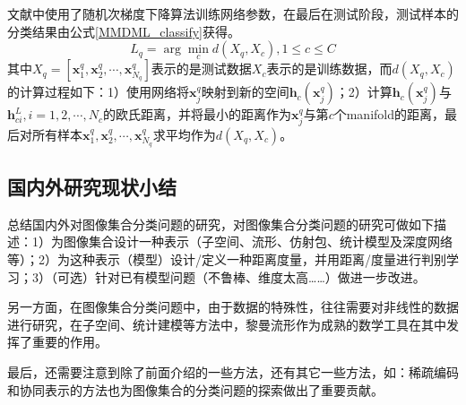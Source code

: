 文献\cite{Deeplearning_MMDML}中使用了随机次梯度下降算法训练网络参数，在最后在测试阶段，测试样本的分类结果由公式\ref{MMDML_classify}获得。
\begin{equation}
\label{MMDML_classify}
L_q=\arg\min_c d(X_q,X_c),1\leq c\leq C
\end{equation}
其中$X_q=[\bm{x}_1^q,\bm{x}_2^q,\cdots,\bm{x}_{N_q}^q]$表示的是测试数据$X_c$表示的是训练数据，而$d(X_q,X_c)$的计算过程如下：1）使用网络将$\bm{x}_j^q$映射到新的空间$\bm{h}_c (\bm{x}_j^q )$；2）计算$\bm{h}_c (\bm{x}_j^q )$与$\bm{h}_{ci}^L,i=1,2,\cdots,N_c$的欧氏距离，并将最小的距离作为$\bm{x}_j^q$与第$c$个manifold的距离，最后对所有样本$\bm{x}_1^q,\bm{x}_2^q,\cdots,\bm{x}_{N_q}^q$求平均作为$d(X_q,X_c)$。
\subsection{国内外研究现状小结}
\label{sec:current_Summarize}
总结国内外对图像集合分类问题的研究，对图像集合分类问题的研究可做如下描述：1）为图像集合设计一种表示（子空间、流形、仿射包、统计模型及深度网络等）；2）为这种表示（模型）设计/定义一种距离度量，并用距离/度量进行判别学习；3）（可选）针对已有模型问题（不鲁棒、维度太高……）做进一步改进。

另一方面，在图像集合分类问题中，由于数据的特殊性，往往需要对非线性的数据进行研究，在子空间、统计建模等方法中，黎曼流形作为成熟的数学工具在其中发挥了重要的作用。 

最后，还需要注意到除了前面介绍的一些方法，还有其它一些方法，如：稀疏编码和协同表示的方法也为图像集合的分类问题的探索做出了重要贡献。

